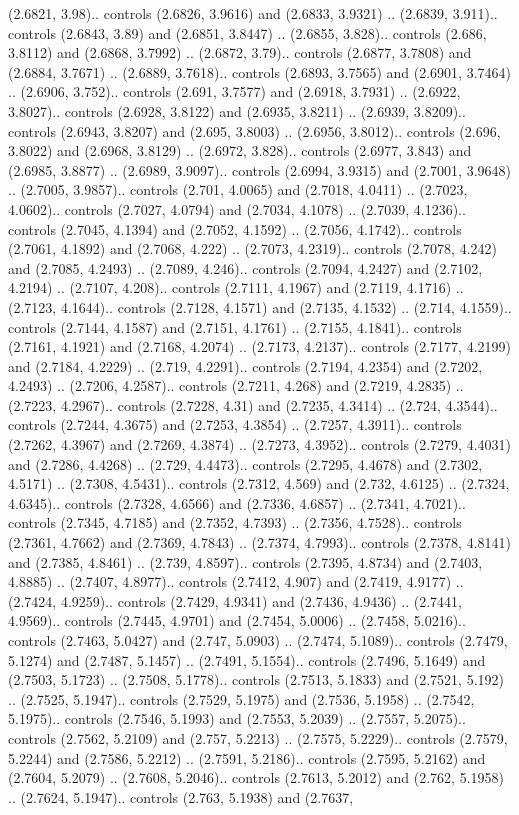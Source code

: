 (2.6821, 3.98).. controls (2.6826, 3.9616) and (2.6833, 3.9321) .. (2.6839, 3.911).. controls (2.6843, 3.89) and (2.6851, 3.8447) .. (2.6855, 3.828).. controls (2.686, 3.8112) and (2.6868, 3.7992) .. (2.6872, 3.79).. controls (2.6877, 3.7808) and (2.6884, 3.7671) .. (2.6889, 3.7618).. controls (2.6893, 3.7565) and (2.6901, 3.7464) .. (2.6906, 3.752).. controls (2.691, 3.7577) and (2.6918, 3.7931) .. (2.6922, 3.8027).. controls (2.6928, 3.8122) and (2.6935, 3.8211) .. (2.6939, 3.8209).. controls (2.6943, 3.8207) and (2.695, 3.8003) .. (2.6956, 3.8012).. controls (2.696, 3.8022) and (2.6968, 3.8129) .. (2.6972, 3.828).. controls (2.6977, 3.843) and (2.6985, 3.8877) .. (2.6989, 3.9097).. controls (2.6994, 3.9315) and (2.7001, 3.9648) .. (2.7005, 3.9857).. controls (2.701, 4.0065) and (2.7018, 4.0411) .. (2.7023, 4.0602).. controls (2.7027, 4.0794) and (2.7034, 4.1078) .. (2.7039, 4.1236).. controls (2.7045, 4.1394) and (2.7052, 4.1592) .. (2.7056, 4.1742).. controls (2.7061, 4.1892) and (2.7068, 4.222) .. (2.7073, 4.2319).. controls (2.7078, 4.242) and (2.7085, 4.2493) .. (2.7089, 4.246).. controls (2.7094, 4.2427) and (2.7102, 4.2194) .. (2.7107, 4.208).. controls (2.7111, 4.1967) and (2.7119, 4.1716) .. (2.7123, 4.1644).. controls (2.7128, 4.1571) and (2.7135, 4.1532) .. (2.714, 4.1559).. controls (2.7144, 4.1587) and (2.7151, 4.1761) .. (2.7155, 4.1841).. controls (2.7161, 4.1921) and (2.7168, 4.2074) .. (2.7173, 4.2137).. controls (2.7177, 4.2199) and (2.7184, 4.2229) .. (2.719, 4.2291).. controls (2.7194, 4.2354) and (2.7202, 4.2493) .. (2.7206, 4.2587).. controls (2.7211, 4.268) and (2.7219, 4.2835) .. (2.7223, 4.2967).. controls (2.7228, 4.31) and (2.7235, 4.3414) .. (2.724, 4.3544).. controls (2.7244, 4.3675) and (2.7253, 4.3854) .. (2.7257, 4.3911).. controls (2.7262, 4.3967) and (2.7269, 4.3874) .. (2.7273, 4.3952).. controls (2.7279, 4.4031) and (2.7286, 4.4268) .. (2.729, 4.4473).. controls (2.7295, 4.4678) and (2.7302, 4.5171) .. (2.7308, 4.5431).. controls (2.7312, 4.569) and (2.732, 4.6125) .. (2.7324, 4.6345).. controls (2.7328, 4.6566) and (2.7336, 4.6857) .. (2.7341, 4.7021).. controls (2.7345, 4.7185) and (2.7352, 4.7393) .. (2.7356, 4.7528).. controls (2.7361, 4.7662) and (2.7369, 4.7843) .. (2.7374, 4.7993).. controls (2.7378, 4.8141) and (2.7385, 4.8461) .. (2.739, 4.8597).. controls (2.7395, 4.8734) and (2.7403, 4.8885) .. (2.7407, 4.8977).. controls (2.7412, 4.907) and (2.7419, 4.9177) .. (2.7424, 4.9259).. controls (2.7429, 4.9341) and (2.7436, 4.9436) .. (2.7441, 4.9569).. controls (2.7445, 4.9701) and (2.7454, 5.0006) .. (2.7458, 5.0216).. controls (2.7463, 5.0427) and (2.747, 5.0903) .. (2.7474, 5.1089).. controls (2.7479, 5.1274) and (2.7487, 5.1457) .. (2.7491, 5.1554).. controls (2.7496, 5.1649) and (2.7503, 5.1723) .. (2.7508, 5.1778).. controls (2.7513, 5.1833) and (2.7521, 5.192) .. (2.7525, 5.1947).. controls (2.7529, 5.1975) and (2.7536, 5.1958) .. (2.7542, 5.1975).. controls (2.7546, 5.1993) and (2.7553, 5.2039) .. (2.7557, 5.2075).. controls (2.7562, 5.2109) and (2.757, 5.2213) .. (2.7575, 5.2229).. controls (2.7579, 5.2244) and (2.7586, 5.2212) .. (2.7591, 5.2186).. controls (2.7595, 5.2162) and (2.7604, 5.2079) .. (2.7608, 5.2046).. controls (2.7613, 5.2012) and (2.762, 5.1958) .. (2.7624, 5.1947).. controls (2.763, 5.1938) and (2.7637, 